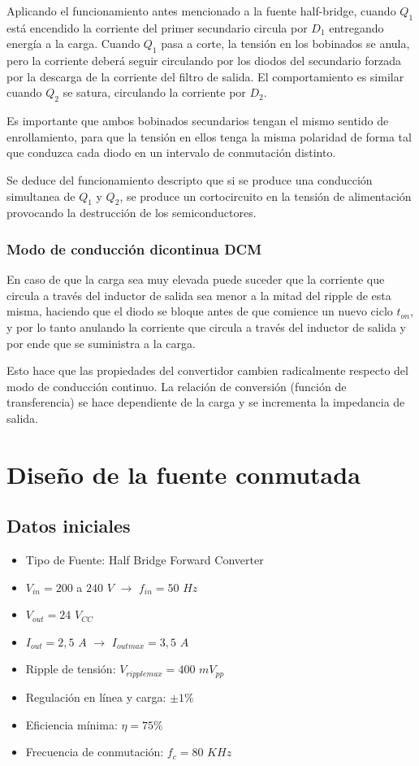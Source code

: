 \documentclass[11pt, a4paper]{article}
\begin{document}
Aplicando el funcionamiento antes mencionado a la fuente half-bridge, cuando $Q_1$ está encendido la corriente del primer secundario circula por $D_1$ entregando energía a la carga. Cuando $Q_1$ pasa a corte, la tensión en los bobinados se anula, pero la corriente deberá seguir circulando por los diodos del secundario forzada por la descarga de la corriente del filtro de salida. El comportamiento es similar cuando $Q_2$ se satura, circulando la corriente por $D_2$.

Es importante que ambos bobinados secundarios tengan el mismo sentido de enrollamiento, para que la tensión en ellos tenga la misma polaridad de forma tal que conduzca cada diodo en un intervalo de conmutación distinto.

Se deduce del funcionamiento descripto que si se produce una conducción simultanea de $Q_1$ y $Q_2$, se produce un cortocircuito en la tensión de alimentación provocando la destrucción de los semiconductores.

\subsubsection{Modo de conducción dicontinua DCM}
En caso de que la carga sea muy elevada puede suceder que la corriente que circula a través del inductor de salida sea menor a la mitad del ripple de esta misma, haciendo que el diodo se bloque antes de que comience un nuevo ciclo $t_{on}$, y por lo tanto anulando la corriente que circula a través del inductor de salida y por ende que se suministra a la carga.

Esto hace que las propiedades del convertidor cambien radicalmente respecto del modo de conducción continuo. La relación de conversión (función de transferencia) se hace dependiente de la carga y se incrementa la impedancia de salida.

\section{Diseño de la fuente conmutada}
\subsection{Datos iniciales}
\begin{itemize}
	\item Tipo de Fuente: Half Bridge Forward Converter
	\item $V_{in} = 200$ a $240$ $V$ $\rightarrow$ $f_{in} = 50$ $Hz$
	\item $V_{out} = 24$ $V_{CC}$
	\item $I_{out} = 2,5$ $A$ $\rightarrow$ $I_{outmax} = 3,5$ $A$
	\item Ripple de tensión: $V_{ripplemax} = 400$ $mV_{pp}$
	\item Regulación en línea y carga: $\pm 1 \%$
	\item Eficiencia mínima: $\eta = 75 \%$
	\item Frecuencia de conmutación: $f_c = 80$ $KHz$
\end{itemize}
\end{document}
